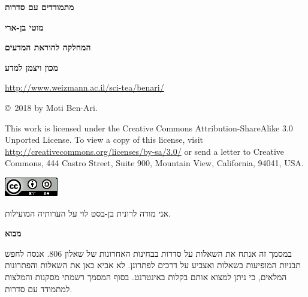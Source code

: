 \documentclass[12pt,a4paper]{article}
\begin{document}
\thispagestyle{empty}


\begin{center}
\textbf{\Huge מתמודדים עם סדרות}

\bigskip
\bigskip

\textbf{\Large מוטי בן-ארי}

\bigskip

\textbf{\Large המחלקה להוראת המדעים}

\bigskip

\textbf{\Large מכון ויצמן למדע}

\bigskip

\url{http://www.weizmann.ac.il/sci-tea/benari/}

\bigskip

\end{center}


\begin{center}
\copyright{}\  2018 by Moti Ben-Ari.
\end{center}

\begin{footnotesize}
This work is licensed under the Creative Commons Attribution-ShareAlike 3.0 Unported License. To view a copy of this license, visit \url{http://creativecommons.org/licenses/by-sa/3.0/} or send a letter to Creative Commons, 444 Castro Street, Suite 900, Mountain View, California, 94041, USA.
\end{footnotesize}

\bigskip

\begin{center}
\includegraphics[width=.2\textwidth]{../by-sa.png}
\end{center}

\bigskip
\bigskip
\bigskip


אני מודה לרונית בן-בסט לוי על הערותיה המועילות.
\newpage

\begin{center}
\textbf{מבוא}
\end{center}

במסמך זה אנתח את השאלות על סדרות בבחינות האחרונות של שאלון
$806$.
אנסה לחפש תבניות המופיעות בשאלות ואצביע על דרכים לפתרונן. לא אביא כאן את השאלות והפתרונות המלאים, כי ניתן למצוא אותם בקלות באינטרנט. בסוף המסמך רשמתי מסקנות והמלצות למתמודד עם סדרות.
\end{document}
